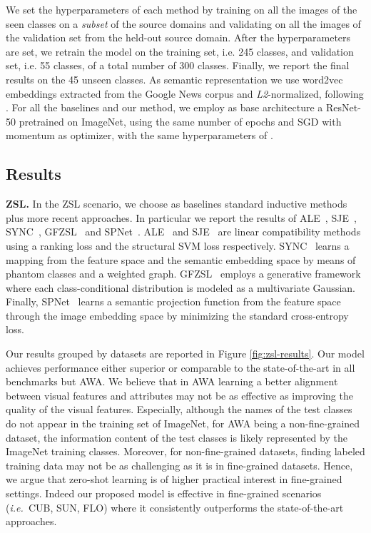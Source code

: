 \documentclass[runningheads]{llncs}
\newcommand{\ie}{\emph{i.e.~}}
\newcommand{\myparagraph}[1]{\noindent\textbf{#1}}
\begin{document}
We set the hyperparameters of each method by training on all the images of the seen classes on a \textit{subset} of the source domains and validating on all the images of the validation set from the held-out source domain. After the hyperparameters are set, we retrain the model on the training set, i.e. 245 classes, and validation set, i.e. 55 classes, of a total number of 300 classes. Finally, we report the final results on the 45 unseen classes. As semantic representation we use word2vec embeddings \cite{mikolov2013efficient} extracted from the Google News corpus and \textit{L2}-normalized, following \cite{thong2019open}.  For all the baselines and our method, we employ as base architecture a ResNet-50 \cite{he2016deep} pretrained on ImageNet, using the same number of epochs and SGD with momentum as optimizer, with the same hyperparameters of \cite{thong2019open}. 


\subsection{Results}

\myparagraph{ZSL.} 
In the ZSL scenario, we choose as baselines standard inductive methods plus more recent approaches. In particular we report the results of ALE~\cite{akata2013label}, SJE~\cite{akata2015evaluation}, SYNC~\cite{changpinyo2016synthesized}, GFZSL~\cite{verma2017simple} and SPNet~\cite{xian2019semantic}. ALE~\cite{akata2013label} and SJE~\cite{akata2015evaluation} are linear compatibility methods using a ranking loss and the structural SVM loss respectively. SYNC~\cite{changpinyo2016synthesized} learns a mapping from the feature space and the semantic embedding space by means of phantom classes and a weighted graph. GFZSL~\cite{verma2017simple} employs a generative framework where each class-conditional distribution is modeled as a multivariate Gaussian. Finally, SPNet~\cite{xian2019semantic} learns a semantic projection function from the feature space through the image embedding space by minimizing the standard cross-entropy loss. 

Our results grouped by datasets are reported in Figure \ref{fig:zsl-results}. 
Our model achieves performance either superior or comparable to the state-of-the-art in all benchmarks but AWA. We believe that in AWA learning a better alignment between visual features and attributes may not be as effective as improving the quality of the visual features. Especially, although the names of the test classes do not appear in the training set of ImageNet, for AWA being a non-fine-grained dataset, the information content of the test classes is likely represented by the ImageNet training classes. Moreover, for non-fine-grained datasets, finding labeled training data may not be as challenging as it is in fine-grained datasets. Hence, we argue that zero-shot learning is of higher practical interest in fine-grained settings. Indeed our proposed model is effective in fine-grained scenarios (\ie CUB, SUN, FLO) where it consistently outperforms the state-of-the-art approaches.
\end{document}
